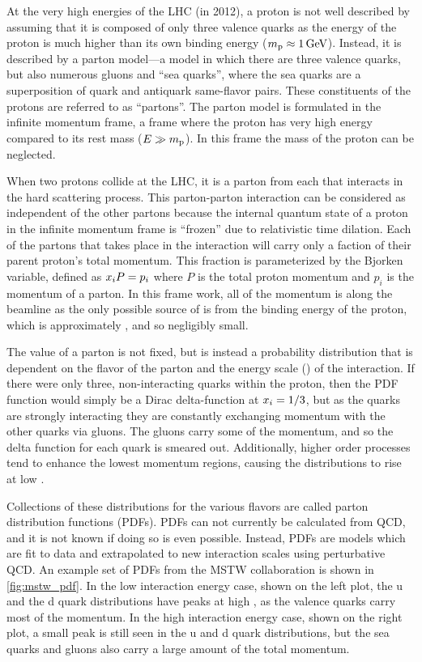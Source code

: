 At the very high energies of the LHC (\rootseight in 2012), a proton is not
well described by assuming that it is composed of only three valence quarks as
the energy of the proton is much higher than its own binding energy
($m_{\text{p}} \approx 1 \,\text{Ge\hspace{-.08em}V}$). Instead, it is described by a parton model---a
model in which there are three valence quarks, but also numerous gluons and
``sea quarks'', where the sea quarks are a superposition of quark and antiquark
same-flavor pairs. These constituents of the protons are referred to as
``partons''. The parton model is formulated in the infinite momentum frame, a
frame where the proton has very high energy compared to its rest mass ($E
\gg m_{\text{p}}$). In this frame the mass of the proton can be neglected.

When two protons collide at the LHC, it is a parton from each that interacts in
the hard scattering process. This parton-parton interaction can be considered
as independent of the other partons because the internal quantum state of a
proton in the infinite momentum frame is ``frozen'' due to relativistic time
dilation. Each of the partons that takes place in the interaction will carry
only a faction of their parent proton's total momentum. This fraction is
parameterized by the Bjorken  variable, defined as $x_{i} P
= p_{i}$ where $P$ is the total proton momentum and $p_{i}$ is the momentum of
a parton. In this frame work, all of the momentum is along the beamline as the
only possible source of \pt is from the binding energy of the proton, which is
approximately \ProtonMass, and so negligibly small. 

The  value of a parton is not fixed, but is instead a probability
distribution that is dependent on the flavor of the parton and the energy scale
(\InteractionEnergy) of the interaction. If there were only three,
non-interacting quarks within the proton, then the PDF function would simply be
a Dirac delta-function at $x_{i} = 1/3$, but as the quarks are strongly
interacting they are constantly exchanging momentum with the other quarks via
gluons. The gluons carry some of the momentum, and so the delta function for
each quark is smeared out. Additionally, higher order processes tend to enhance
the lowest momentum regions, causing the distributions to rise at low
.

Collections of these distributions for the various flavors are called parton
distribution functions (PDFs). PDFs can not currently be calculated from QCD,
and it is not known if doing so is even possible. Instead, PDFs are models
which are fit to data and extrapolated to new interaction scales using
perturbative QCD. An example set of PDFs from the MSTW
collaboration\cite{martin_2009} is shown in \cref{fig:mstw_pdf}. In the low
interaction energy case, shown on the left plot, the u and the d quark
distributions have peaks at high , as the valence quarks carry most
of the momentum. In the high interaction energy case, shown on the right plot,
a small peak is still seen in the u and d quark distributions, but the sea
quarks and gluons also carry a large amount of the total momentum.

